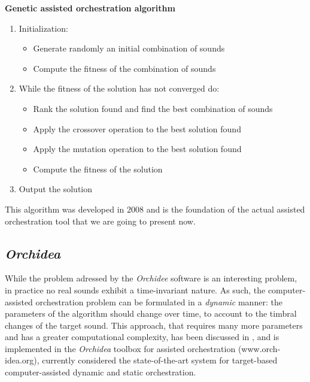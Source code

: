 \documentclass[a4paper]{book}
\begin{document}
\textbf{Genetic assisted orchestration algorithm}
\begin{enumerate}
    \item Initialization:
    \begin{itemize}
        \item Generate randomly an initial combination of sounds 
        \item Compute the fitness of the combination of sounds 
    \end{itemize}
    \item While the fitness of the solution has not converged do:
    \begin{itemize}
        \item Rank the solution found and find the best combination of sounds
        \item Apply the crossover operation to the best solution found
        \item Apply the mutation operation to the best solution found
        \item Compute the fitness of the solution
    \end{itemize}
    \item Output the solution
\end{enumerate}

This algorithm was developed in 2008 and is the foundation of the actual assisted orchestration tool that we are going to present now.

\subsection{\textit{Orchidea}}

While the problem adressed by the \textit{Orchidee} software is an interesting problem, in practice no real sounds exhibit a time-invariant nature. As such, the computer-assisted orchestration problem can be formulated in a \emph{dynamic} manner: the parameters of the algorithm should change over time, to account to the timbral changes of the target sound.
This approach, that requires many more parameters and has a greater computational complexity, has been discussed in \cite{Cella2018},
\cite{Cella2020b} and is implemented in the \textit{Orchidea} toolbox for assisted orchestration ({www.orch-idea.org}), currently considered the state-of-the-art system for target-based computer-assisted dynamic and static orchestration.
\end{document}

